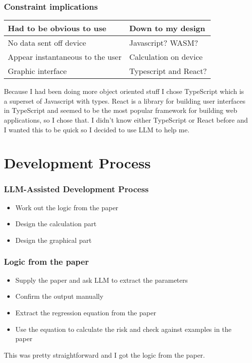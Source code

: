 \documentclass{beamer}
\begin{document}
\begin{frame}
    \frametitle{Constraint implications}
    \begin{tabular}{|l|l|}
        \hline
        Had to be obvious to use & \pause Down to my design \pause \\
        \hline
        No data sent off device & \pause Javascript? WASM? \pause \\
        \hline
        Appear instantaneous to the user & \pause Calculation on device \pause \\
        \hline
        Graphic interface & \pause Typescript and React? \\
        \hline
    \end{tabular}

    \vspace{1cm}

    Because I had been doing more object oriented stuff I chose TypeScript which is a superset of Javascript with types. React is a library for building user interfaces in TypeScript and seemed to be the most popular framework for building web applications, so I chose that. I didn't know either TypeScript or React before and I wanted this to be quick so I decided to use LLM to help me.
\end{frame}

\section{Development Process}
\begin{frame}
    \frametitle{LLM-Assisted Development Process}
    \begin{itemize}
        \item Work out the logic from the paper
        \item Design the calculation part
        \item Design the graphical part
    \end{itemize}
\end{frame}

\begin{frame}
    \frametitle{Logic from the paper}
    \begin{itemize}
        \item Supply the paper and ask LLM to extract the parameters
        \item Confirm the output manually
        \item Extract the regression equation from the paper
        \item Use the equation to calculate the risk and check against examples in the paper
    \end{itemize}

    \vspace{0.5cm}
    This was pretty straightforward and I got the logic from the paper.
\end{frame}
\end{document}
